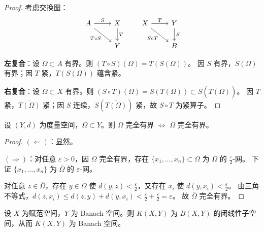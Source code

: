 \documentclass[lang=cn,a4paper,newtx,section]{elegantbook}
\begin{document}
\begin{proof}
  考虑交换图：
  \[
    \begin{tikzcd}
      A \arrow[r,"S"] \arrow[dr,"T\circ S"'] & X \arrow[d,"T"] \\
      & Y
    \end{tikzcd}
    \qquad
    \begin{tikzcd}
      X \arrow[r,"T"] \arrow[dr,"S\circ T"'] & Y \arrow[d,"S"] \\
      & B
    \end{tikzcd}
  \]
  
  \textbf{左复合}：设 $\Omega\subset A$ 有界。则 $(T\circ S)(\Omega)=T(S(\Omega))$。
  因 $S$ 有界，$S(\Omega)$ 有界；因 $T$ 紧，$T(S(\Omega))$ 蕴含紧。

  \textbf{右复合}：设 $\Omega\subset X$ 有界。则 $(S\circ T)(\Omega)=S(T(\Omega))\subset S(\overline{T(\Omega)})$。
  因 $T$ 紧，$\overline{T(\Omega)}$ 紧；因 $S$ 连续，$S(\overline{T(\Omega)})$ 紧，故 $S\circ T$ 为紧算子。
\end{proof}

\begin{proposition}
  设 $(Y,d)$ 为度量空间，$\Omega\subset Y$。则 $\Omega$ 完全有界 $\Longleftrightarrow$ $\overline{\Omega}$ 完全有界。
\end{proposition}

\begin{proof}
  $(\Leftarrow)$：显然。

  $(\Rightarrow)$：对任意 $\varepsilon>0$，因 $\Omega$ 完全有界，存在 $\{x_1,\ldots,x_n\}\subset\Omega$ 为 $\Omega$ 的 $\frac{\varepsilon}{2}$-网。
  下证 $\{x_1,\ldots,x_n\}$ 为 $\overline{\Omega}$ 的 $\varepsilon$-网。
  
  对任意 $z\in\overline{\Omega}$，存在 $y\in\Omega$ 使 $d(y,z)<\frac{\varepsilon}{2}$，又存在 $x_i$ 使 $d(y,x_i)<\frac{\varepsilon}{2}$。
  由三角不等式，$d(z,x_i)\le d(z,y)+d(y,x_i)<\frac{\varepsilon}{2}+\frac{\varepsilon}{2}=\varepsilon$。
  故 $\overline{\Omega}$ 完全有界。
\end{proof}

\begin{theorem}
  设 $X$ 为赋范空间，$Y$ 为 Banach 空间。则 $K(X,Y)$ 为 $B(X,Y)$ 的闭线性子空间，从而 $K(X,Y)$ 为 Banach 空间。
\end{theorem}
\end{document}
